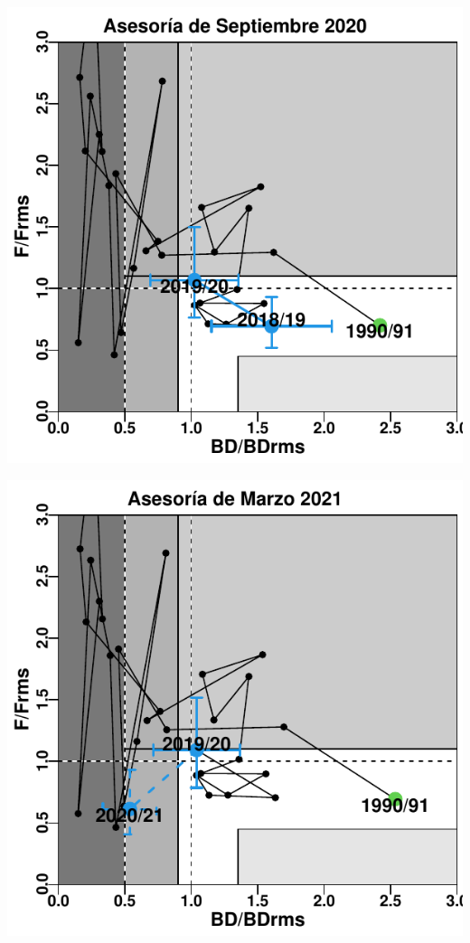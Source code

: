\documentclass[
  spanish,
]{article}
\begin{document}
\begin{center}\includegraphics{FigurasInforme_Marzo/Fig40_DFsept-1} \end{center}

\vspace{-0.3cm}
\footnotesize

\begin{center}\includegraphics{FigurasInforme_Marzo/Fig41_DFmarzo-1} \end{center}
\end{document}
